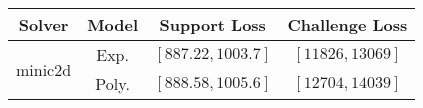 \begin{tabular}{cc|c|c} 
\hline 
 Solver & Model & Support Loss  & Challenge Loss \tabularnewline\hline 
\hline 
\multirow{2}{*}{minic2d} & Exp. & $\left[887.22,1003.7\right]$ & $\left[11826,13069\right]$ \tabularnewline 
 & Poly. & $\left[888.58,1005.6\right]$ & $\left[12704,14039\right]$ \tabularnewline 
\hline 
\end{tabular} 

